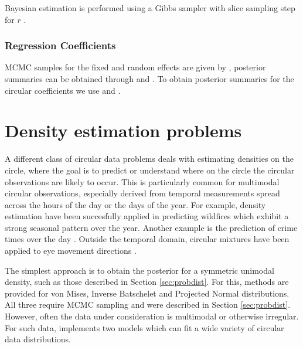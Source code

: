 Bayesian estimation is performed using a Gibbs sampler with slice
sampling step for \(r\) \citep{hernandez2017general}.

\hypertarget{regression-coefficients-1}{%
\subsubsection{Regression
Coefficients}\label{regression-coefficients-1}}

MCMC samples for the fixed and random effects are given by
, posterior summaries can be obtained
through  and . To
obtain posterior summaries for the circular coefficients
\citep{longitudinalpaper} we use  and
.

\hypertarget{density-estimation-problems}{%
\section{Density estimation
problems}\label{density-estimation-problems}}

\label{densest}

A different class of circular data problems deals with estimating
densities on the circle, where the goal is to predict or understand
where on the circle the circular observations are likely to occur. This
is particularly common for multimodal circular observations, especially
derived from temporal measurements spread across the hours of the day or
the days of the year. For example, density estimation have been
succesfully applied in predicting wildfires
\citep{ameijeiras2018directional, ley2018applied} which exhibit a strong
seasonal pattern over the year. Another example is the prediction of
crime times over the day \citep{ashby2013comparison}. Outside the
temporal domain, circular mixtures have been applied to eye movement
directions \citep{van2016infants}.

The simplest approach is to obtain the posterior for a symmetric
unimodal density, such as those described in Section \ref{sec:probdist}.
For this, methods are provided for von Mises, Inverse Batschelet and
Projected Normal distributions. All three require MCMC sampling and were
described in Section \ref{sec:probdist}. However, often the data under
consideration is multimodal or otherwise irregular. For such data,
 implements two models which can fit a wide variety of
circular data distributions.

